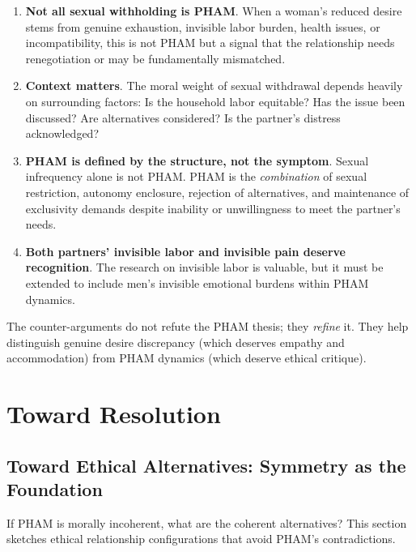 \documentclass[12pt,openany]{book}
\numberwithin{equation}{chapter}
\begin{document}
\begin{enumerate}
    \item \textbf{Not all sexual withholding is PHAM}. When a woman's reduced desire stems from genuine exhaustion, invisible labor burden, health issues, or incompatibility, this is not PHAM but a signal that the relationship needs renegotiation or may be fundamentally mismatched.
    
    \item \textbf{Context matters}. The moral weight of sexual withdrawal depends heavily on surrounding factors: Is the household labor equitable? Has the issue been discussed? Are alternatives considered? Is the partner's distress acknowledged?
    
    \item \textbf{PHAM is defined by the structure, not the symptom}. Sexual infrequency alone is not PHAM. PHAM is the \textit{combination} of sexual restriction, autonomy enclosure, rejection of alternatives, and maintenance of exclusivity demands despite inability or unwillingness to meet the partner's needs.
    
    \item \textbf{Both partners' invisible labor and invisible pain deserve recognition}. The research on invisible labor is valuable, but it must be extended to include men's invisible emotional burdens within PHAM dynamics.
\end{enumerate}

The counter-arguments do not refute the PHAM thesis; they \textit{refine} it. They help distinguish genuine desire discrepancy (which deserves empathy and accommodation) from PHAM dynamics (which deserve ethical critique).

\part{Toward Resolution}

\chapter{Toward Ethical Alternatives: Symmetry as the Foundation}

If PHAM is morally incoherent, what are the coherent alternatives? This section sketches ethical relationship configurations that avoid PHAM's contradictions.
\end{document}
